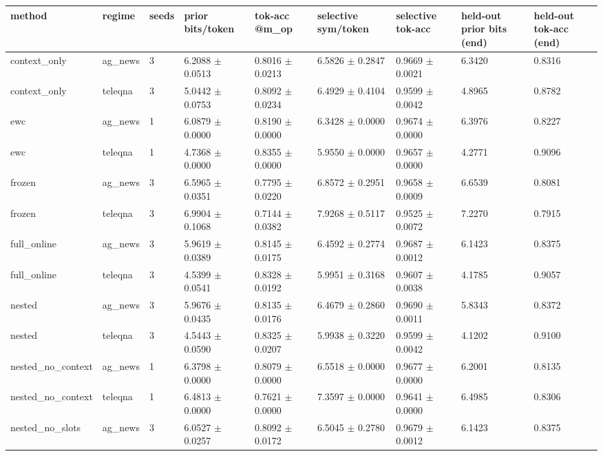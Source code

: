 \begin{tabular}{lllllllll}
\hline
method & regime & seeds & prior bits/token & tok-acc @m\_op & selective sym/token & selective tok-acc & held-out prior bits (end) & held-out tok-acc (end) \\
\hline
context\_only & ag\_news & 3 & 6.2088 $\pm$ 0.0513 & 0.8016 $\pm$ 0.0213 & 6.5826 $\pm$ 0.2847 & 0.9669 $\pm$ 0.0021 & 6.3420 & 0.8316 \\
context\_only & teleqna & 3 & 5.0442 $\pm$ 0.0753 & 0.8092 $\pm$ 0.0234 & 6.4929 $\pm$ 0.4104 & 0.9599 $\pm$ 0.0042 & 4.8965 & 0.8782 \\
ewc & ag\_news & 1 & 6.0879 $\pm$ 0.0000 & 0.8190 $\pm$ 0.0000 & 6.3428 $\pm$ 0.0000 & 0.9674 $\pm$ 0.0000 & 6.3976 & 0.8227 \\
ewc & teleqna & 1 & 4.7368 $\pm$ 0.0000 & 0.8355 $\pm$ 0.0000 & 5.9550 $\pm$ 0.0000 & 0.9657 $\pm$ 0.0000 & 4.2771 & 0.9096 \\
frozen & ag\_news & 3 & 6.5965 $\pm$ 0.0351 & 0.7795 $\pm$ 0.0220 & 6.8572 $\pm$ 0.2951 & 0.9658 $\pm$ 0.0009 & 6.6539 & 0.8081 \\
frozen & teleqna & 3 & 6.9904 $\pm$ 0.1068 & 0.7144 $\pm$ 0.0382 & 7.9268 $\pm$ 0.5117 & 0.9525 $\pm$ 0.0072 & 7.2270 & 0.7915 \\
full\_online & ag\_news & 3 & 5.9619 $\pm$ 0.0389 & 0.8145 $\pm$ 0.0175 & 6.4592 $\pm$ 0.2774 & 0.9687 $\pm$ 0.0012 & 6.1423 & 0.8375 \\
full\_online & teleqna & 3 & 4.5399 $\pm$ 0.0541 & 0.8328 $\pm$ 0.0192 & 5.9951 $\pm$ 0.3168 & 0.9607 $\pm$ 0.0038 & 4.1785 & 0.9057 \\
nested & ag\_news & 3 & 5.9676 $\pm$ 0.0435 & 0.8135 $\pm$ 0.0176 & 6.4679 $\pm$ 0.2860 & 0.9690 $\pm$ 0.0011 & 5.8343 & 0.8372 \\
nested & teleqna & 3 & 4.5443 $\pm$ 0.0590 & 0.8325 $\pm$ 0.0207 & 5.9938 $\pm$ 0.3220 & 0.9599 $\pm$ 0.0042 & 4.1202 & 0.9100 \\
nested\_no\_context & ag\_news & 1 & 6.3798 $\pm$ 0.0000 & 0.8079 $\pm$ 0.0000 & 6.5518 $\pm$ 0.0000 & 0.9677 $\pm$ 0.0000 & 6.2001 & 0.8135 \\
nested\_no\_context & teleqna & 1 & 6.4813 $\pm$ 0.0000 & 0.7621 $\pm$ 0.0000 & 7.3597 $\pm$ 0.0000 & 0.9641 $\pm$ 0.0000 & 6.4985 & 0.8306 \\
nested\_no\_slots & ag\_news & 3 & 6.0527 $\pm$ 0.0257 & 0.8092 $\pm$ 0.0172 & 6.5045 $\pm$ 0.2780 & 0.9679 $\pm$ 0.0012 & 6.1423 & 0.8375 \\

\end{tabular}
